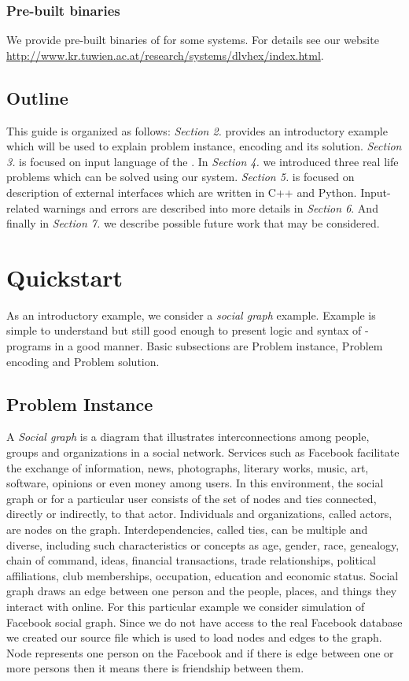\documentclass[14pt,a4paper, titlepage]{article}
\begin{document}
\subsubsection{Pre-built binaries}
We provide pre-built binaries of \dlvhex{} for some systems. For details see our website \url{http://www.kr.tuwien.ac.at/research/systems/dlvhex/index.html}. 

\subsection{Outline}
This guide is organized as follows: \emph{Section 2.} provides an introductory example which will be used to explain problem instance, encoding and its solution. \emph{Section 3.} is focused on input language of the \dlvhex{}. In \emph{Section 4.} we introduced three real life problems which can be solved using our system. \emph{Section 5.} is focused on description of external interfaces which are written in C++ and Python. Input-related warnings and errors are described into more details in \emph{Section 6}. And finally in \emph{Section 7.} we describe possible future work that may be considered.

\section{Quickstart} %
As an introductory example, we consider a \emph{social graph} example. Example is simple to understand  but still good enough to present logic and syntax of \hex{}-programs in a good manner. Basic subsections are Problem instance, Problem encoding and Problem solution.  

\subsection{Problem Instance}
A \emph{Social graph} is a diagram that illustrates interconnections among people, groups 
and organizations in a social network. Services such as Facebook facilitate the exchange 
of information, news, photographs, literary works, music, art, software, opinions or even 
money among users. In this environment, the social graph or for a particular user consists 
of the set of nodes and ties connected, directly or indirectly, to that actor. 
Individuals and organizations, called actors, are nodes on the graph. Interdependencies, 
called ties, can be multiple and diverse, including such characteristics or concepts as age, 
gender, race, genealogy, chain of command, ideas, financial transactions, trade relationships, 
political affiliations, club memberships, occupation, education and economic status. 
Social graph draws an edge between one person and the people, places, and things they interact 
with online. For this particular example we consider simulation of Facebook social graph. 
Since we do not have access to the real Facebook database we created our source file which is 
used to load nodes and edges to the graph. Node represents one person on the Facebook and if 
there is edge between one or more persons then it means there is friendship between them.  
\end{document}
